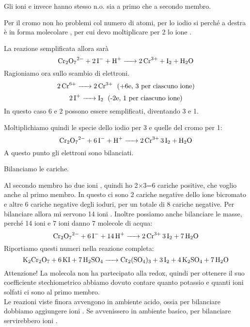 Gli ioni  e  invece hanno stesso n.o. sia a primo che a secondo membro.

Per il cromo non ho problemi col numero di atomi, per lo iodio si perché a destra è in forma molecolare , per cui devo moltiplicare per 2 lo ione .

La reazione semplificata allora sarà
$$\ce{Cr_2O_7^2- + 2I^- + H+ -> 2Cr^3+ + I_2 + H_2O}$$
Ragioniamo ora sullo scambio di elettroni.
$$\ce{2Cr^6+ -> 2Cr^3+ \; \text{(+6e, 3 per ciascuno ione)}}$$
$$\ce{2I+ -> I_2 \; \text{(-2e, 1 per ciascuno ione)}}$$
In questo caso 6 e 2 possono essere semplificati, diventando 3 e 1.

Moltiplichiamo quindi le specie dello iodio per 3 e quelle del cromo per 1:
$$\ce{Cr_2O_7^2- + 6I^- + H+ -> 2Cr^3+ 3I_2 + H_2O}$$
A questo punto gli elettroni sono bilanciati.

Bilanciamo le cariche.

Al secondo membro ho due ioni , quindi ho 2$\times$3=6 cariche positive, che voglio anche al primo membro. In questo ci sono 2 cariche negative dello ione bicromato e altre 6 cariche negative degli ioduri, per un totale di 8 cariche negative. Per bilanciare allora mi servono 14 ioni . Inoltre possiamo anche bilanciare le masse, perché 14 ioni  e 7 ioni  danno 7 molecole di acqua:
$$\ce{Cr_2O_7^2- + 6I^- + 14H+ -> 2Cr^3+ 3I_2 + 7H_2O}$$
Riportiamo questi numeri nella reazione completa:
$$\ce{K_2Cr_2O_7 + 6KI + 7H_2SO_4 -> Cr_2(SO_4)_3 + 3I_2 + 4K_2SO_4 + 7H_2O}$$
Attenzione! La molecola  non ha partecipato alla redox, quindi per ottenere il suo coefficiente stechiometrico abbiamo dovuto contare quanto potassio e quanti ioni solfati ci sono al primo membro.\\

Le reazioni viste finora avvengono in ambiente acido, ossia per bilanciare dobbiamo aggiungere ioni . Se avvenissero in ambiente basico, per bilanciare servirebbero ioni .
